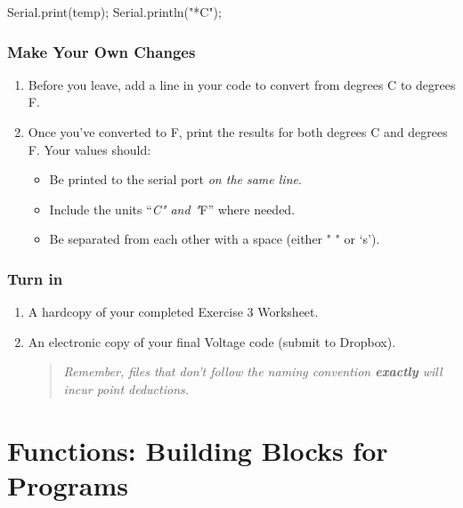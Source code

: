 \documentclass[]{book}
\newenvironment{Shaded}{\begin{snugshade}}{\end{snugshade}}
\newcommand{\NormalTok}[1]{#1}
\newcommand{\StringTok}[1]{\textcolor[rgb]{0.31,0.60,0.02}{#1}}
\providecommand{\tightlist}{%
  \setlength{\itemsep}{0pt}\setlength{\parskip}{0pt}}
\begin{document}
\begin{Shaded}
\begin{Highlighting}[]
\NormalTok{    Serial.print(temp);}
\NormalTok{    Serial.println(}\StringTok{"*C"}\NormalTok{);}
\end{Highlighting}
\end{Shaded}

\hypertarget{make-your-own-changes-1}{%
\subsection{Make Your Own Changes}\label{make-your-own-changes-1}}

\begin{enumerate}
\def\labelenumi{\arabic{enumi}.}
\tightlist
\item
  Before you leave, add a line in your code to convert from degrees C to degrees F.
\item
  Once you've converted to F, print the results for both degrees C and degrees F. Your values should:

  \begin{itemize}
  \tightlist
  \item
    Be printed to the serial port \emph{on the same line}.
  \item
    Include the units ``\emph{C" and "}F'' where needed.
  \item
    Be separated from each other with a space (either " " or `s').
  \end{itemize}
\end{enumerate}

\hypertarget{turn-in-1}{%
\subsection{Turn in}\label{turn-in-1}}

\begin{enumerate}
\def\labelenumi{\arabic{enumi}.}
\item
  A hardcopy of your completed Exercise 3 Worksheet.
\item
  An electronic copy of your final Voltage code (submit to Dropbox).

  \begin{quote}
  \emph{Remember, files that don't follow the naming convention \textbf{exactly} will incur point deductions.}
  \end{quote}
\end{enumerate}

\hypertarget{functions-building-blocks-for-programs}{%
\chapter{Functions: Building Blocks for Programs}\label{functions-building-blocks-for-programs}}
\end{document}
